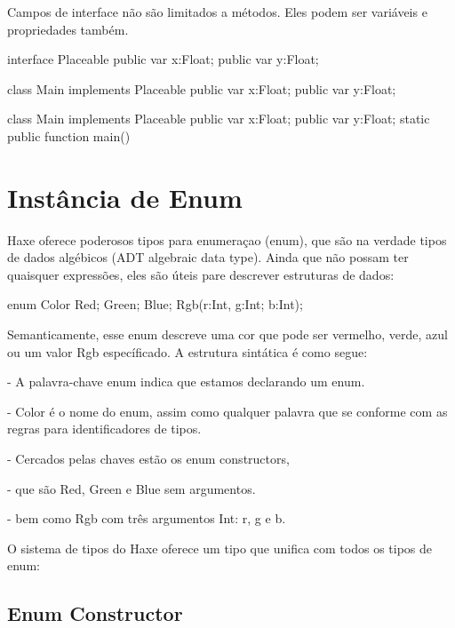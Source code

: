 {Campos de interface não são limitados a métodos. Eles podem ser variáveis e propriedades também.

interface Placeable {
   public var x:Float;
   public var y:Float;
}

class Main implements Placeable {
   public var x:Float;
   public var y:Float;
}

class Main implements Placeable {
   public var x:Float;
   public var y:Float;
   static public function main(){ }
}


\section{Instância de Enum}

Haxe oferece poderosos tipos para enumeraçao (enum), que são na verdade tipos de dados algébicos (ADT algebraic data type). Ainda que não possam ter quaisquer expressões, eles são úteis pare descrever estruturas de dados:

enum Color {
Red;
Green;
Blue;
Rgb(r:Int, g:Int; b:Int);
}

Semanticamente, esse enum descreve uma cor que pode ser vermelho, verde, azul ou um valor Rgb específicado. A estrutura sintática é como segue:

- A palavra-chave enum indica que estamos declarando um enum.

- Color é o nome do enum, assim como qualquer palavra que se conforme com as regras para identificadores de tipos.

- Cercados pelas chaves estão os enum constructors,

- que são Red, Green e Blue sem argumentos.

- bem como Rgb com três argumentos Int: r, g e b.

O sistema de tipos do Haxe oferece um tipo que unifica com todos os tipos de  enum:


\subsection{Enum Constructor}

}
